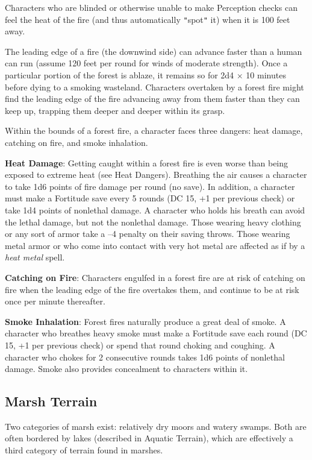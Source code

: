 Characters who are blinded or otherwise unable to make Perception checks can feel the heat of the fire (and thus automatically \texttt{{}"{}}spot\texttt{{}"{}} it) when it is 100 feet away.
				
The leading edge of a fire (the downwind side) can advance faster than a human can run (assume 120 feet per round for winds of moderate strength). Once a particular portion of the forest is ablaze, it remains so for 2d4 \mbox{$\times$} 10 minutes before dying to a smoking wasteland. Characters overtaken by a forest fire might find the leading edge of the fire advancing away from them faster than they can keep up, trapping them deeper and deeper within its grasp.
				
Within the bounds of a forest fire, a character faces three dangers: heat damage, catching on fire, and smoke inhalation. 
				
\textbf{Heat Damage}: Getting caught within a forest fire is even worse than being exposed to extreme heat (see Heat Dangers). Breathing the air causes a character to take 1d6 points of fire damage per round (no save). In addition, a character must make a Fortitude save every 5 rounds (DC 15, +1 per previous check) or take 1d4 points of nonlethal damage. A character who holds his breath can avoid the lethal damage, but not the nonlethal damage. Those wearing heavy clothing or any sort of armor take a --4 penalty on their saving throws. Those wearing metal armor or who come into contact with very hot metal are affected as if by a \textit{heat metal }spell.
				
\textbf{Catching on Fire}: Characters engulfed in a forest fire are at risk of catching on fire when the leading edge of the fire overtakes them, and continue to be at risk once per minute thereafter.
				
\textbf{Smoke Inhalation}: Forest fires naturally produce a great deal of smoke. A character who breathes heavy smoke must make a Fortitude save each round (DC 15, +1 per previous check) or spend that round choking and coughing. A character who chokes for 2 consecutive rounds takes 1d6 points of nonlethal damage. Smoke also provides concealment to characters within it.
				
\subsection{Marsh Terrain}

				
Two categories of marsh exist: relatively dry moors and watery swamps. Both are often bordered by lakes (described in Aquatic Terrain), which are effectively a third category of terrain found in marshes.

